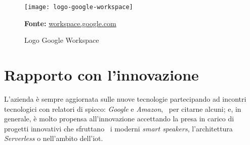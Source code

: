 \vspace{20pt}
  \begin{figure}[!ht]
    \begin{center}
      \texttt{[image: logo-google-workspace]}
      \caption{Logo Google Workspace}
      \textbf{Fonte:} \href{https://workspace.google.com}{workspace.google.com}
    \end{center}
  \end{figure}
\vspace{20pt} 

\section{Rapporto con l'innovazione}
L'azienda è sempre aggiornata sulle nuove tecnologie partecipando ad incontri tecnologici con relatori di spicco: \emph{Google} e \emph{Amazon}, \
per citarne alcuni; e, in generale, è molto propensa all'innovazione accettando la presa in carico di progetti innovativi che sfruttano \
i moderni \emph{smart speakers}, l'architettura \emph{Serverless} o nell'ambito dell'\acrfull{iot}.